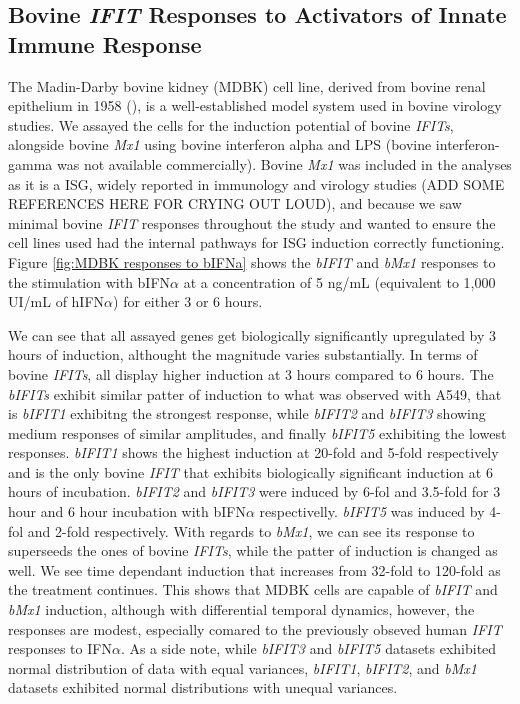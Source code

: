 \subsection{Bovine \textit{IFIT} Responses to Activators of Innate Immune Response} \label{subsec:Bovine IFIT Responses to Activators of Innate Immune Response}
The Madin-Darby bovine kidney (MDBK) cell line, derived from bovine renal epithelium in 1958 (\cite{Madin1958EstablishedOrigin}), is a well-established model system used in bovine virology studies. We assayed the cells for the induction potential of bovine \textit{IFITs}, alongside bovine \textit{Mx1} using bovine interferon alpha and LPS (bovine interferon-gamma was not available commercially). Bovine \textit{Mx1} was included in the analyses as it is a ISG, widely reported in immunology and virology studies (ADD SOME REFERENCES HERE FOR CRYING OUT LOUD), and because we saw minimal bovine \textit{IFIT} responses throughout the study and wanted to ensure the cell lines used had the internal pathways for ISG induction correctly functioning. Figure \ref{fig:MDBK responses to bIFNa} shows the \textit{bIFIT} and \textit{bMx1} responses to the stimulation with bIFN\(\alpha\) at a concentration of 5 ng/mL (equivalent to 1,000 UI/mL of hIFN\(\alpha\)) for either 3 or 6 hours.

We can see that all assayed genes get biologically significantly upregulated by 3 hours of induction, althought the magnitude varies substantially. In terms of bovine \textit{IFITs}, all display higher induction at 3 hours compared to 6 hours. The \textit{bIFITs} exhibit similar patter of induction to what was observed with A549, that is \textit{bIFIT1} exhibitng the strongest response, while \textit{bIFIT2} and \textit{bIFIT3} showing medium responses of similar amplitudes, and finally \textit{bIFIT5} exhibiting the lowest responses. \textit{bIFIT1} shows the highest induction at 20-fold and 5-fold respectively and is the only bovine \textit{IFIT} that exhibits biologically significant induction at 6 hours of incubation. \textit{bIFIT2} and \textit{bIFIT3} were induced by 6-fol and 3.5-fold for 3 hour and 6 hour incubation with bIFN\(\alpha\) respectivelly. \textit{bIFIT5} was induced by 4-fol and 2-fold respectively. With regards to \textit{bMx1}, we can see its response to superseeds the ones of bovine \textit{IFITs}, while the patter of induction is changed as well. We see time dependant induction that increases from 32-fold to 120-fold as the treatment continues. This shows that MDBK cells are capable of \textit{bIFIT} and \textit{bMx1} induction, although with differential temporal dynamics, however, the responses are modest, especially comared to the previously obseved human \textit{IFIT} responses to IFN\(\alpha\). As a side note, while \textit{bIFIT3} and \textit{bIFIT5} datasets exhibited normal distribution of data with equal variances, \textit{bIFIT1}, \textit{bIFIT2}, and \textit{bMx1} datasets exhibited normal distributions with unequal variances.

